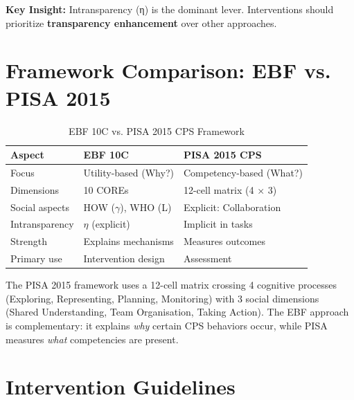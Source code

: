\textbf{Key Insight:} Intransparency (η) is the dominant lever. Interventions should prioritize \textbf{transparency enhancement} over other approaches.



\section{Framework Comparison: EBF vs. PISA 2015}
\label{sec:cps-comparison}

\begin{table}[htbp]
\centering
\caption{EBF 10C vs. PISA 2015 CPS Framework}
\label{tab:framework-comparison}
\begin{tabular}{lll}
\toprule
\textbf{Aspect} & \textbf{EBF 10C} & \textbf{PISA 2015 CPS} \\
\midrule
Focus & Utility-based (Why?) & Competency-based (What?) \\
Dimensions & 10 COREs & 12-cell matrix (4 × 3) \\
Social aspects & HOW ($\gamma$), WHO (L) & Explicit: Collaboration \\
Intransparency & $\eta$ (explicit) & Implicit in tasks \\
Strength & Explains mechanisms & Measures outcomes \\
Primary use & Intervention design & Assessment \\
\bottomrule
\end{tabular}
\end{table}

The PISA 2015 framework uses a 12-cell matrix crossing 4 cognitive processes (Exploring, Representing, Planning, Monitoring) with 3 social dimensions (Shared Understanding, Team Organisation, Taking Action). The EBF approach is complementary: it explains \textit{why} certain CPS behaviors occur, while PISA measures \textit{what} competencies are present.



\section{Intervention Guidelines}
\label{sec:cps-interventions}

